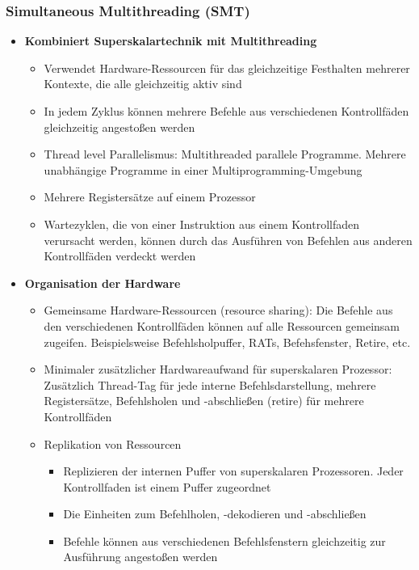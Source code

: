 \subsubsection{Simultaneous Multithreading (SMT)}
\begin{itemize}
	\item \textbf{Kombiniert Superskalartechnik mit Multithreading}
	\begin{itemize}
		\item Verwendet Hardware-Ressourcen für das gleichzeitige Festhalten mehrerer Kontexte, die alle gleichzeitig aktiv sind
		\item In jedem Zyklus können mehrere Befehle aus verschiedenen Kontrollfäden gleichzeitig angestoßen werden
		\item Thread level Parallelismus: Multithreaded parallele Programme. Mehrere unabhängige Programme in einer Multiprogramming-Umgebung
		\item Mehrere Registersätze auf einem Prozessor
		\item Wartezyklen, die von einer Instruktion aus einem Kontrollfaden verursacht werden, können durch das Ausführen von Befehlen aus anderen Kontrollfäden verdeckt werden
	\end{itemize}
	\item \textbf{Organisation der Hardware}
	\begin{itemize}
		\item Gemeinsame Hardware-Ressourcen (resource sharing): Die Befehle aus den verschiedenen Kontrollfäden können auf alle Ressourcen gemeinsam zugeifen. Beispielsweise Befehlsholpuffer, RATs, Befehsfenster, Retire, etc.
		\item Minimaler zusätzlicher Hardwareaufwand für superskalaren Prozessor: Zusätzlich Thread-Tag für jede interne Befehlsdarstellung, mehrere Registersätze, Befehlsholen und -abschließen (retire) für mehrere Kontrollfäden
		\item Replikation von Ressourcen
		\begin{itemize}
			\item Replizieren der internen Puffer von superskalaren Prozessoren. Jeder Kontrollfaden ist einem Puffer zugeordnet
			\item Die Einheiten zum Befehlholen, -dekodieren und -abschließen
			\item Befehle können aus verschiedenen Befehlsfenstern gleichzeitig zur Ausführung angestoßen werden
		\end{itemize}
	\end{itemize}
\end{itemize}


